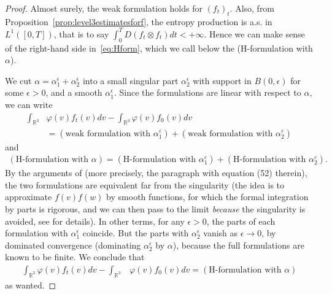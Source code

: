 \documentclass[11pt,a4paper]{article}
\theoremstyle{definition}
\theoremstyle{plain}
\begin{document}
\begin{proof}
    Almost surely, the weak formulation holds for $(f_t)_t$.
    Also, from Proposition~\ref{prop:level3estimatesforf}, the entropy production is a.s. in $L^1([0,T])$, that is to say
    $\int_0^T D(f_t \otimes f_t)dt <+\infty.$
    Hence we can make sense of the right-hand side in~\eqref{eq:Hform}, which we call below the (H-formulation with $\alpha$).

    We cut $\alpha=\alpha_1^\epsilon+\alpha_2^\epsilon$ into a small singular part $\alpha_2^\epsilon$ with support in $B(0,\epsilon)$ for some $\epsilon>0$, and a smooth $\alpha_1^ \epsilon$. Since the formulations are linear with respect to $\alpha$, we can write
    \begin{align*}
     \int_{\mathbb{R}^3} &\varphi(v) f_t(v)dv-\int_{\mathbb{R}^3} \varphi(v) f_0(v) dv\\
     &= (\text{weak formulation with }\alpha_1^\varepsilon)+(\text{weak formulation with }\alpha_2^\varepsilon)
    \end{align*}
    and
    \begin{align*}
     (\text{H-formulation with }\alpha)= (\text{H-formulation with }\alpha_1^\varepsilon)+(\text{H-formulation with }\alpha_2^\varepsilon).
    \end{align*}
    By the arguments of \cite[Section 6]{Villani1998} (more precisely, the paragraph with equation (52) therein), the two formulations are equivalent far from the singularity (the idea is to approximate $f(v)f(w)$ by smooth functions, for which the formal integration by parts is rigorous, and we can then pass to the limit \textit{because} the singularity is avoided, see \cite{Villani1998} for details). In other terms, for any $\epsilon>0$, the parts of each formulation with $\alpha_1^\epsilon$ coincide. But the parts with $\alpha_2^\epsilon$ vanish as $\epsilon\rightarrow 0$, by dominated convergence (dominating $\alpha_2^\epsilon$ by $\alpha$), because the full formulations are known to be finite. We conclude that 
    \begin{align*}
     \int_{\mathbb{R}^3} \varphi(v) f_t(v)dv-\int_{\mathbb{R}^3} &\varphi(v) f_0(v) dv\nonumber =(\text{H-formulation with }\alpha)
    \end{align*}
    as wanted.
\end{proof}
\end{document}
